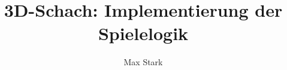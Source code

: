 \documentclass{../3dchess}
\title{3D-Schach: Implementierung der Spielelogik}
\author{Max Stark}
\begin{document}
  \maketitle  
  
  \tableofcontents
    
  
  
  
  
    
  \appendix
  
  
  \nocite{*}
\end{document}
